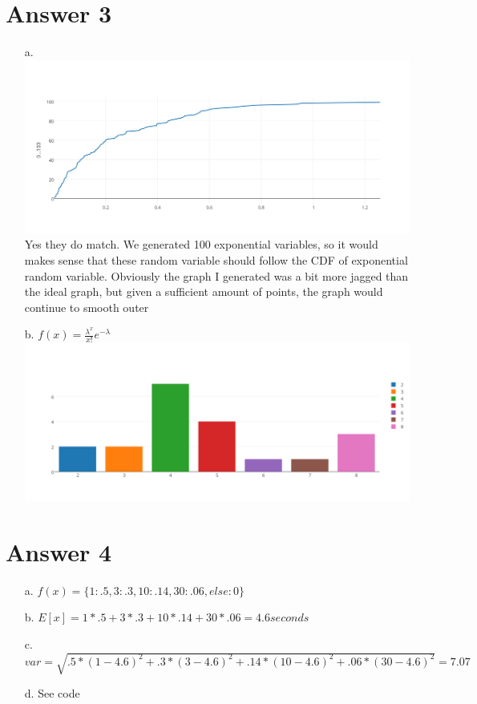 \documentclass[11pt]{article}
\theoremstyle{definition}
\begin{document}
\section*{Answer 3}
\begin{enumerate}
	\item[a.] \includegraphics*[scale=0.5]{Q3A.png}
	Yes they do match.  We generated 100 exponential variables, so it would makes sense that these random variable should follow the CDF of exponential random variable.  Obviously the graph I generated
	was a bit more jagged than the ideal graph, but given a sufficient amount of points, the graph would continue to smooth outer
	
	\item[b.] $f(x) = \frac{\lambda^x}{x!}e^{-\lambda}$\\
	\includegraphics*[scale=0.5]{q3b.png}
\end{enumerate}

\section*{Answer 4}
\begin{enumerate}
	\item[a.] $f(x) = \{1: .5, 3: .3, 10: .14, 30: .06, else: 0\}$
	\item[b.] $E[x] = 1*.5 + 3*.3 + 10*.14 + 30*.06 = 4.6seconds$
	\item[c.] $var = \sqrt{.5*(1 - 4.6)^2 + .3*(3-4.6)^2 + .14*(10-4.6)^2 + .06*(30 - 4.6)^2} = 7.07$
	\item[d.] See code
\end{enumerate}
\end{document}
